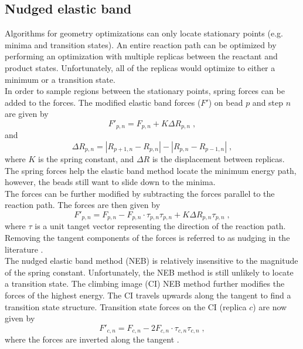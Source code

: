 \documentclass[12pt]{report}
\begin{document}
\subsection{Nudged elastic band}

Algorithms for geometry optimizations can only locate stationary points (e.g.
minima and transition states).
An entire reaction path can be optimized by performing an optimization with
multiple replicas between the reactant and product states.
Unfortunately, all of the replicas would optimize to either a minimum or
a transition state. \\

In order to sample regions between the stationary points, spring forces
can be added to the forces.
The modified elastic band forces ($F'$) on bead $p$ and step $n$ are given
by
\begin{equation}
 F'_{p,n} = F_{p,n}+K\Delta R_{p,n} \; ,
\end{equation}
and
\begin{equation}
 \Delta R_{p,n} = |R_{p+1,n}-R_{p,n}|-|R_{p,n}-R_{p-1,n}| \; ,
\end{equation}
where $K$ is the spring constant, and $\Delta R$ is the displacement between
replicas.
The spring forces help the elastic band method locate the minimum energy
path, however, the beads still want to slide down to the minima. \\

The forces can be further modified by subtracting the forces parallel to the
reaction path.
The forces are then given 
by \cite{NEB2000_A,NEB2000_B}
\begin{equation}
 F'_{p,n} = F_{p,n}-F_{p,n}\cdot\tau_{p,n}\tau_{p,n}
            +K\Delta R_{p,n}\tau_{p,n} \; ,
\end{equation}
where $\tau$ is a unit tanget vector representing the direction of the
reaction path.
Removing the tangent components of the forces is referred to as nudging in
the literature \cite{NEB2000_A,NEB2000_B}. \\

The nudged elastic band method (NEB) is relatively insensitive to the
magnitude of the spring constant.
Unfortunately, the NEB method 
is still unlikely to locate a transition state.
The climbing image (CI) 
NEB method \cite{NEB2000_A} 
further modifies the forces of the
highest energy.
The CI travels upwards along the tangent to find a transition
state structure.
Transition state forces on the CI (replica $c$) are now given by
\begin{equation}
 F'_{c,n} = F_{c,n}-2F_{c,n}\cdot\tau_{c,n}\tau_{c,n} \; ,
\end{equation}
where the forces are inverted along the 
tangent \cite{NEB2000_A}. \\
\end{document}
